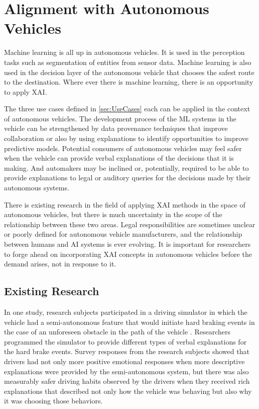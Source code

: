 \section{Alignment with Autonomous Vehicles}\label{sec:Alignment}

Machine learning is all up in autonomous vehicles.  It is used in the perception tasks such as segmentation of entities from sensor data.  Machine learning is also used in the decision layer of the autonomous vehicle that chooses the safest route to the destination.  Where ever there is machine learning, there is an opportunity to apply XAI.

The three use cases defined in \ref{sec:UseCases} each can be applied in the context of autonomous vehicles.  The development process of the ML systems in the vehicle can be strengthened by data provenance techniques that improve collaboration or also by using explanations to identify opportunities to improve predictive models.  Potential consumers of autonomous vehicles may feel safer when the vehicle can provide verbal explanations of the decisions that it is making.  And automakers may be inclined or, potentially, required to be able to provide explanations to legal or auditory queries for the decisions made by their autonomous systems.

There is existing research in the field of applying XAI methods in the space of autonomous vehicles, but there is much uncertainty in the scope of the relationship between these two areas.  Legal responsibilities are sometimes unclear or poorly defined for autonomous vehicle manufacturers, and the relationship between humans and AI systems is ever evolving.  It is important for researchers to forge ahead on incorporating XAI concepts in autonomous vehicles before the demand arises, not in response to it.

\subsection{Existing Research}

In one study, research subjects participated in a driving simulator in which the vehicle had a semi-autonomous feature that would initiate hard braking events in the case of an unforeseen obstacle in the path of the vehicle \cite{Koo2015}.  Researchers programmed the simulator to provide different types of verbal explanations for the hard brake events.  Survey responses from the research subjects showed that drivers had not only more positive emotional responses when more descriptive explanations were provided by the semi-autonomous system, but there was also measurably safer driving habits observed by the drivers when they received rich explanations that described not only how the vehicle was behaving but also why it was choosing those behaviors.

